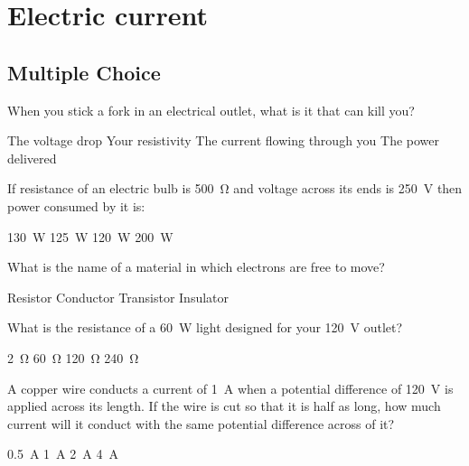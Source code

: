 \section{Electric current}

\subsection{Multiple Choice}
\question When you stick a fork in an electrical outlet, what is it that can kill you?
\begin{checkboxes}
\choice The voltage drop
\choice Your resistivity
\CorrectChoice The current flowing through you \correct
\choice The power delivered
\end{checkboxes}


\question If resistance of an electric bulb is \SI{500}{\ohm} and voltage across its ends is \SI{250}{V} then power consumed by it is:
\begin{checkboxes}
\choice \SI{130}{W}
\CorrectChoice \SI{125}{W} \correct
\choice \SI{120}{W}
\choice \SI{200}{W}
\end{checkboxes}

\question What is the name of a material in which electrons are free to move?
\begin{checkboxes}
\choice Resistor
\CorrectChoice Conductor \correct
\choice Transistor
\choice Insulator
\end{checkboxes}

\question What is the resistance of a \SI{60}{W} light designed for your \SI{120}{V} outlet? 
\begin{checkboxes}
\choice \SI{2}{\ohm}
\choice \SI{60}{\ohm}
\choice \SI{120}{\ohm}
\CorrectChoice \SI{240}{\ohm} \correct
\end{checkboxes}

\question A copper wire conducts a current of \SI{1}{A} when a potential difference of \SI{120}{V} is applied across its length. If the wire is cut so that it is half as long, how much current will it conduct with the same potential difference across of it?
\begin{checkboxes}
\choice \SI{0.5}{A}
\choice \SI{1}{A}
\CorrectChoice \SI{2}{A} \correct
\choice \SI{4}{A}
\end{checkboxes}

